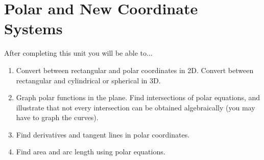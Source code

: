 \documentclass[10pt,]{book}
\theoremstyle{plain}
\theoremstyle{definition}
\theoremstyle{definition}
\theoremstyle{definition}
\theoremstyle{definition}
\theoremstyle{definition}
\numberwithin{equation}{section}
\begin{document}
\chapter[{Polar and New Coordinate Systems}]{Polar and New Coordinate Systems}\label{chapter-5}
After completing this unit you will be able to... \leavevmode%
\begin{enumerate}
\item\hypertarget{li-42}{}Convert between rectangular and polar coordinates in 2D. Convert between rectangular and cylindrical or spherical in 3D.%
\item\hypertarget{li-43}{}Graph polar functions in the plane. Find intersections of polar equations, and illustrate that not every intersection can be obtained algebraically (you may have to graph the curves).%
\item\hypertarget{li-44}{}Find derivatives and tangent lines in polar coordinates.%
\item\hypertarget{li-45}{}Find area and arc length using polar equations.%
\end{enumerate}
%
\typeout{************************************************}
\typeout{************************************************}
\end{document}
